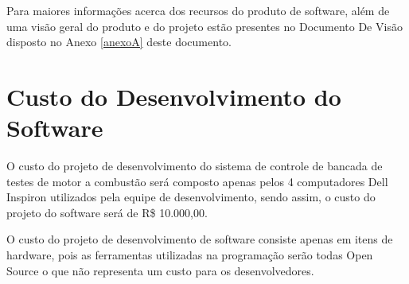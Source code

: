 Para maiores informações acerca dos recursos do produto de software, além de uma visão geral do produto e do projeto estão presentes no Documento De Visão disposto no Anexo \ref{anexoA} deste documento.

\section{Custo do Desenvolvimento do Software}

O custo do projeto de desenvolvimento do sistema de controle de bancada de testes de motor a combustão será composto apenas pelos 4 computadores Dell Inspiron utilizados pela equipe de desenvolvimento, sendo assim, o custo do projeto do software será de R\$ 10.000,00.

O custo do projeto de desenvolvimento de software consiste apenas em itens de hardware, pois as ferramentas utilizadas na programação serão todas Open Source o que não representa um custo para os desenvolvedores.
